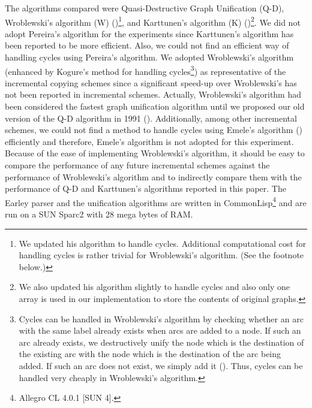 The algorithms compared were Quasi-Destructive Graph Unification
(Q-D), Wroblewski's algorithm (W) (\cite{Wroblewski})\footnote{We
updated his algorithm to handle cycles. Additional computational cost
for handling cycles is rather trivial for Wroblewski's algorithm. (See
the footnote below.)}, and Karttunen's algorithm (K)
(\cite{reversible})\footnote{We also updated his algorithm slightly to
handle cycles and also only one array is used in our implementation to
store the contents of original graphs.}.  We did not adopt Pereira's
algorithm for the experiments since Karttunen's algorithm has been
reported to be more efficient. Also, we could not find an efficient
way of handling cycles using Pereira's algorithm. We adopted
Wroblewski's algorithm (enhanced by Kogure's method for handling
cycles\footnote{Cycles can be handled in Wroblewski's algorithm by
checking whether an arc with the same label already exists when arcs
are added to a node. If such an arc already exists, we destructively
unify the node which is the destination of the existing arc with the
node which is the destination of the arc being added. If such an arc
does not exist, we simply add it (\cite{Kogure}). Thus, cycles can be
handled very cheaply in Wroblewski's algorithm.}) as representative of
the incremental copying schemes since a significant speed-up over
Wroblewski's has not been reported in incremental schemes. Actually,
Wroblewski's algorithm had been considered the fastest graph
unification algorithm until we proposed our old version of the Q-D
algorithm in 1991 (\cite{quasi}).  Additionally, among other
incremental schemes, we could not find a
method to handle cycles using Emele's algorithm (\cite{Emele})
efficiently and therefore, Emele's algorithm is not adopted for this
experiment. Because of the ease of implementing Wroblewski's
algorithm, it should be easy to compare the performance of any future
incremental schemes against the performance of Wroblewski's algorithm
and to indirectly compare them with the performance of Q-D and
Karttunen's algorithms reported in this paper.  The Earley parser and
the unification algorithms are written in CommonLisp\footnote{Allegro
CL 4.0.1 [SUN 4].} and are run on a SUN Sparc2 with 28 mega bytes of
RAM.

